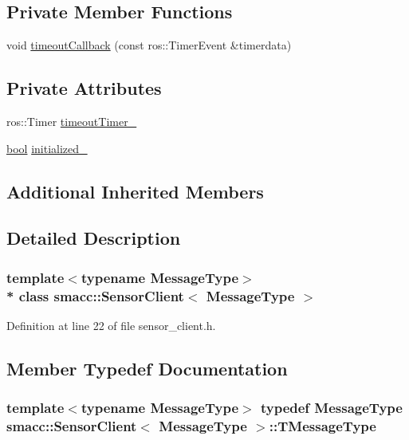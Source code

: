 \subsection*{Private Member Functions}
\begin{DoxyCompactItemize}
\item 
void \hyperlink{classsmacc_1_1SensorClient_adea5a6e03330691fd0bd30acf1594011}{timeout\+Callback} (const ros\+::\+Timer\+Event \&timerdata)
\end{DoxyCompactItemize}
\subsection*{Private Attributes}
\begin{DoxyCompactItemize}
\item 
ros\+::\+Timer \hyperlink{classsmacc_1_1SensorClient_a5a82e2fa1f0ccfe2564125fae2f9783a}{timeout\+Timer\+\_\+}
\item 
\hyperlink{classbool}{bool} \hyperlink{classsmacc_1_1SensorClient_a7dde11291a16f6c2edaa02552895ee9e}{initialized\+\_\+}
\end{DoxyCompactItemize}
\subsection*{Additional Inherited Members}


\subsection{Detailed Description}
\subsubsection*{template$<$typename Message\+Type$>$\\*
class smacc\+::\+Sensor\+Client$<$ Message\+Type $>$}



Definition at line 22 of file sensor\+\_\+client.\+h.



\subsection{Member Typedef Documentation}
\subsubsection[{\texorpdfstring{T\+Message\+Type}{TMessageType}}]{\setlength{\rightskip}{0pt plus 5cm}template$<$typename Message\+Type$>$ typedef Message\+Type {\bf smacc\+::\+Sensor\+Client}$<$ Message\+Type $>$\+::{\bf T\+Message\+Type}}\hypertarget{classsmacc_1_1SensorClient_a5a35234e021e849d213a3dae58094ac5}{}\label{classsmacc_1_1SensorClient_a5a35234e021e849d213a3dae58094ac5}


